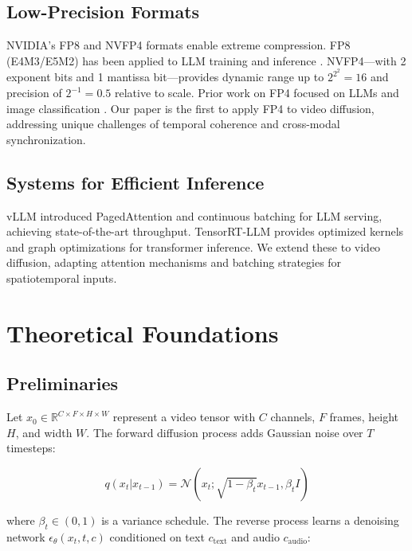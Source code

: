\documentclass[journal]{IEEEtran}
\theoremstyle{definition}
\theoremstyle{remark}
\newcommand{\RR}{\mathbb{R}}
\begin{document}
\subsection{Low-Precision Formats}
NVIDIA's FP8 \cite{nvidia2022fp8} and NVFP4 \cite{nvidia2024nvfp4} formats enable extreme compression. FP8 (E4M3/E5M2) has been applied to LLM training \cite{dettmers2023qlora} and inference \cite{frantar2023gptq}. NVFP4---with 2 exponent bits and 1 mantissa bit---provides dynamic range up to $2^{2^2} = 16$ and precision of $2^{-1} = 0.5$ relative to scale. Prior work on FP4 focused on LLMs \cite{kim2024fp4} and image classification \cite{zhao2023fp4}. Our paper is the first to apply FP4 to video diffusion, addressing unique challenges of temporal coherence and cross-modal synchronization.

\subsection{Systems for Efficient Inference}
vLLM \cite{kwon2023efficient} introduced PagedAttention and continuous batching for LLM serving, achieving state-of-the-art throughput. TensorRT-LLM \cite{nvidia2024tensorrt} provides optimized kernels and graph optimizations for transformer inference. We extend these to video diffusion, adapting attention mechanisms and batching strategies for spatiotemporal inputs.

\section{Theoretical Foundations}
\label{sec:theory}

\subsection{Preliminaries}
Let $x_0 \in \RR^{C \times F \times H \times W}$ represent a video tensor with $C$ channels, $F$ frames, height $H$, and width $W$. The forward diffusion process adds Gaussian noise over $T$ timesteps:

\begin{equation}
q(x_t | x_{t-1}) = \mathcal{N}(x_t; \sqrt{1-\beta_t} x_{t-1}, \beta_t I)
\end{equation}

where $\beta_t \in (0,1)$ is a variance schedule. The reverse process learns a denoising network $\epsilon_\theta(x_t, t, c)$ conditioned on text $c_{\text{text}}$ and audio $c_{\text{audio}}$:
\end{document}
